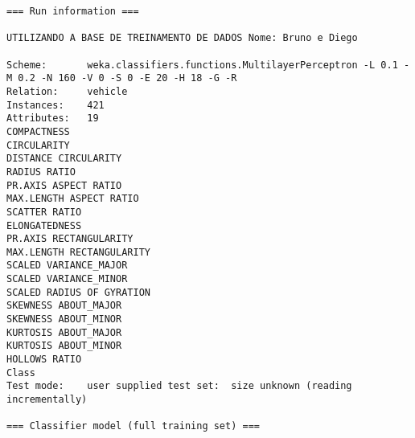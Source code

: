 \documentclass[
	article,			%
	11pt,				%
	oneside,			%
	a4paper,			%
	english,			%
	brazil,				%
	sumario=tradicional
	]{abntex2}
\begin{document}
\begin{lstlisting}
=== Run information ===

UTILIZANDO A BASE DE TREINAMENTO DE DADOS Nome: Bruno e Diego

Scheme:       weka.classifiers.functions.MultilayerPerceptron -L 0.1 -M 0.2 -N 160 -V 0 -S 0 -E 20 -H 18 -G -R
Relation:     vehicle
Instances:    421
Attributes:   19
COMPACTNESS
CIRCULARITY
DISTANCE CIRCULARITY
RADIUS RATIO
PR.AXIS ASPECT RATIO
MAX.LENGTH ASPECT RATIO
SCATTER RATIO
ELONGATEDNESS
PR.AXIS RECTANGULARITY
MAX.LENGTH RECTANGULARITY
SCALED VARIANCE_MAJOR
SCALED VARIANCE_MINOR
SCALED RADIUS OF GYRATION
SKEWNESS ABOUT_MAJOR
SKEWNESS ABOUT_MINOR
KURTOSIS ABOUT_MAJOR
KURTOSIS ABOUT_MINOR
HOLLOWS RATIO
Class
Test mode:    user supplied test set:  size unknown (reading incrementally)

=== Classifier model (full training set) ===


\end{lstlisting}
\end{document}
